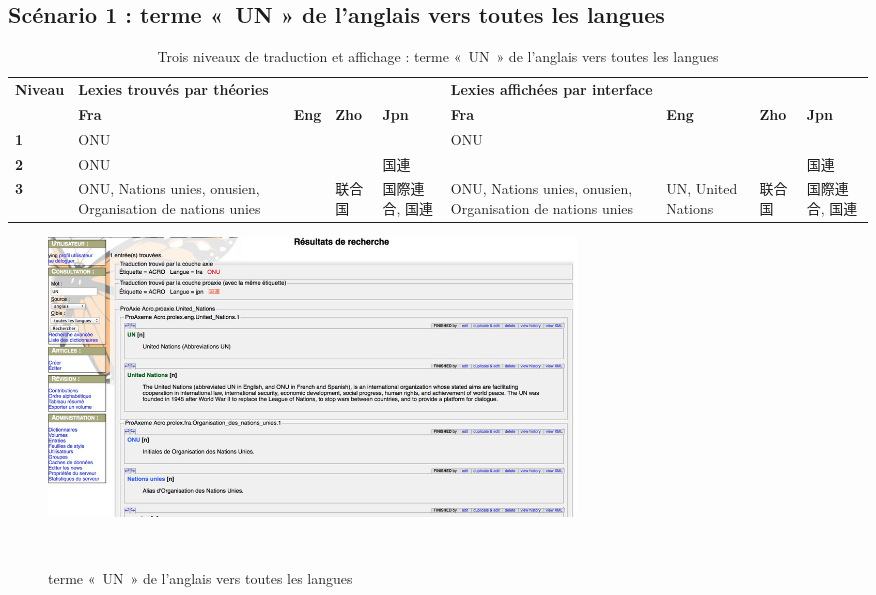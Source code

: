 \documentclass[10pt,a4paper,twoside]{article}
\newcommand{\Chinois}[1]{{\fontspec[Scale=0.9]{STSong}#1}}
\newcommand{\Japonais}[1]{{\fontspec[Scale=0.9]{Hiragino Kaku Gothic Pro}#1}}
\begin{document}
\subsection{Scénario 1 : terme « UN » de l'anglais vers toutes les langues}

\begin{table}[!h]
\centering
	\begin{tabular}{|p{1cm}|p{1.8cm}|p{0.5cm}|p{1cm}|p{1cm}|p{1.8cm}|p{1cm}|p{1cm}|p{1cm}|}
	\hline
	\textbf{Niveau} & \multicolumn{4}{l|}{\textbf{ Lexies trouvés par théories}}&\multicolumn{4}{l|}{\textbf{Lexies affichées par interface}} \\
	\cline{2-9}
	&\textbf{Fra} & \textbf{Eng} & \textbf{Zho} & \textbf{Jpn} & \textbf{Fra} & \textbf{Eng}  & \textbf{Zho} & \textbf{Jpn} \\
	\hline
	\textbf{1} & ONU &  &  &  & ONU &  &  &   \\
	\hline
	\textbf{2} & ONU &  &  &\Japonais{国連}&  &  &  &\Japonais{国連} \\
	\hline
	\textbf{3} & \raggedright ONU, Nations unies, onusien, Organisation de nations unies & \raggedright  & \raggedright \Chinois{联合国} & \raggedright \Japonais{国際連合}, \Japonais{国連} & \raggedright ONU, Nations unies, onusien, Organisation de nations unies  & \raggedright UN, United Nations &  \raggedright \Chinois{联合国} & \Japonais{国際連合}, \Japonais{国連} \\
	\hline
	\end{tabular}
\caption{ Trois niveaux de traduction et affichage : terme « UN » de l'anglais vers toutes les langues}\label{table-scenario1}
\end{table}

\begin{figure}[htbp] 
\begin{center} 
\includegraphics[width=14cm]{images/scenario1-1.jpg}
\end{center} 
\caption{terme « UN » de l'anglais vers toutes les langues} \label{image-scenario1-1} \
\end{figure}
\end{document}
